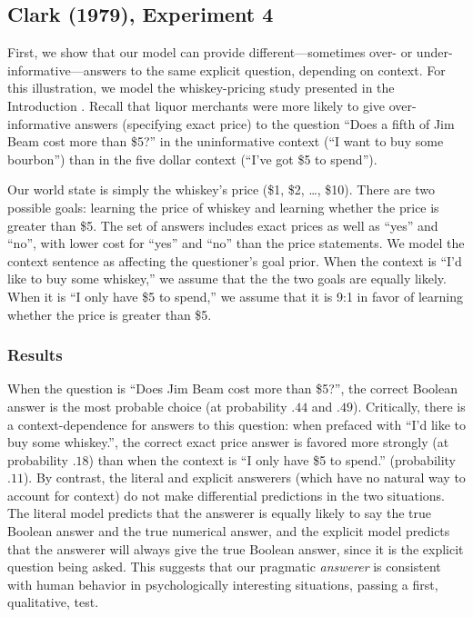 \documentclass[12pt, floatsintext, jou]{apa6}
\begin{document}
\subsection{Clark (1979), Experiment 4}
First, we show that our model can provide different---sometimes over- or under-informative---answers to the same explicit question, depending on context. For this illustration, we model the whiskey-pricing study presented in the Introduction \cite{Clark79_IndirectSpeechActs}. Recall that liquor merchants were more likely to give over-informative answers (specifying exact price) to the question ``Does a fifth of Jim Beam cost more than \$5?'' in the uninformative context (``I want to buy some bourbon'') than in the five dollar context (``I've got \$5 to spend'').

Our world state is simply the whiskey's price (\$1, \$2, \dots, \$10). There are two possible goals: learning the price of whiskey and learning whether the price is greater than \$5.  The set of answers includes exact prices as well as ``yes'' and ``no'', with lower cost for ``yes'' and ``no'' than the price statements. We model the context sentence as affecting the questioner's goal prior. When the context is ``I'd like to buy some whiskey,'' we assume that the the two goals are equally likely. When it is ``I only have \$5 to spend,'' we assume that it is 9:1 in favor of learning whether the price is greater than \$5.

\subsubsection{Results} 
When the question is ``Does Jim Beam cost more than \$5?'', the correct Boolean answer is  the most probable choice (at probability $.44$ and $.49$). Critically, there is a context-dependence for answers to this question: when prefaced with ``I'd like to buy some whiskey.'', the correct exact price answer is favored more strongly (at probability $.18$) than when the context is ``I only have \$5 to spend.'' (probability $.11$). By contrast, the literal and explicit answerers (which have no natural way to account for context) do not make differential predictions in the two situations. The literal model predicts that the answerer is equally likely to say the true Boolean answer and the true numerical answer, and the explicit model predicts that the answerer will always give the true Boolean answer, since it is the explicit question being asked. This suggests that our pragmatic \emph{answerer} is consistent with human behavior in psychologically interesting situations, passing a first, qualitative, test. 
\end{document}
